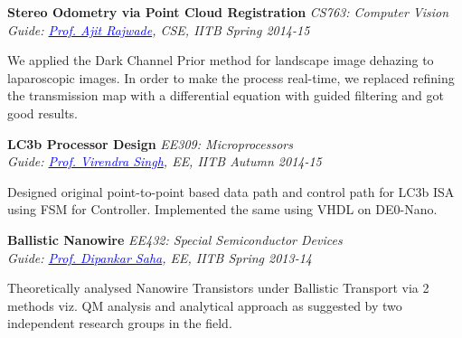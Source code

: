 \documentclass[margin,line]{res}
\newenvironment{list1}{
  \begin{list}{\ding{113}}{%
      \setlength{\itemsep}{0in}
      \setlength{\parsep}{0in} \setlength{\parskip}{0in}
      \setlength{\topsep}{0in} \setlength{\partopsep}{0in} 
      \setlength{\leftmargin}{0.17in}}}{\end{list}}
\begin{document}
\begin{resume}
\vspace*{-0.1in}

{\bf Stereo Odometry via Point Cloud Registration} \hfill \textit{CS763: Computer Vision}\\
{\em Guide: \href{https://www.cse.iitb.ac.in/~ajitvr}{\textcolor{blue}{Prof. Ajit Rajwade}}, CSE, IITB \hfill Spring 2014-15}\\
\vspace*{-.15in}
\begin{list1}
\item[] We applied the Dark Channel Prior method for landscape image dehazing to laparoscopic images. In order to make the process real-time, we replaced refining the transmission map with a differential equation with guided filtering and got good results.
\end{list1}

\vspace*{-0.1in}

{\bf LC3b Processor Design} \hfill \textit{EE309: Microprocessors}\\
{\em Guide: \href{https://www.ee.iitb.ac.in/~viren/}{\textcolor{blue}{Prof. Virendra Singh}}, EE, IITB \hfill Autumn 2014-15}\\
\vspace*{-.15in}
\begin{list1}
\item[]Designed original point-to-point based data path and control path for LC3b ISA using FSM for Controller. Implemented the same using VHDL on DE0-Nano.
\end{list1}

\vspace*{-0.1in}

{\bf Ballistic Nanowire} \hfill \textit{EE432: Special Semiconductor Devices}\\
{\em Guide: \href{https://www.ee.iitb.ac.in/wiki/faculty/dsaha}{\textcolor{blue}{Prof. Dipankar Saha}}, EE, IITB \hfill Spring 2013-14}\\
\vspace*{-.15in}
\begin{list1}
\item[]Theoretically analysed Nanowire Transistors under Ballistic Transport via 2 methods viz. QM analysis and analytical approach as suggested by two independent research groups in the field.
\end{list1}


\end{resume}
\end{document}

